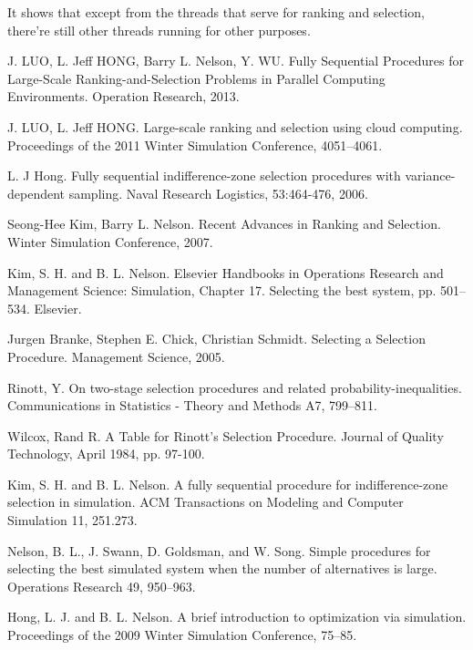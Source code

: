 \documentclass[12pt,a4paper]{report}
\begin{document}
It shows that except from the threads that serve for ranking and selection, there're still other threads running for other purposes.

\newpage
%

%

\begin{thebibliography}{99}

 J. LUO, L. Jeff HONG, Barry L. Nelson, Y. WU. Fully Sequential Procedures for Large-Scale Ranking-and-Selection Problems in Parallel Computing Environments. Operation Research, 2013.

 J. LUO, L. Jeff HONG. Large-scale ranking and selection using cloud computing. Proceedings of the 2011 Winter Simulation Conference, 4051–4061.

 L. J Hong. Fully sequential indifference-zone selection procedures with variance-dependent sampling. Naval Research Logistics, 53:464-476, 2006.

 Seong-Hee Kim, Barry L. Nelson. Recent Advances in Ranking and Selection. Winter Simulation Conference, 2007.

 Kim, S. H. and B. L. Nelson. Elsevier Handbooks in Operations Research and Management Science: Simulation, Chapter 17. Selecting the best system, pp. 501–534. Elsevier.

 Jurgen Branke, Stephen E. Chick, Christian Schmidt. Selecting a Selection Procedure. Management Science, 2005.

 Rinott, Y. On two-stage selection procedures and related probability-inequalities. Communications in Statistics - Theory and Methods A7, 799–811.

 Wilcox, Rand R. A Table for Rinott's Selection Procedure. Journal of Quality Technology, April 1984, pp. 97-100.

 Kim, S. H. and B. L. Nelson. A fully sequential procedure for indifference-zone selection in simulation. ACM Transactions on Modeling and Computer Simulation 11, 251.273.

 Nelson, B. L., J. Swann, D. Goldsman, and W. Song. Simple procedures for selecting the best simulated system when the number of alternatives is large. Operations Research 49, 950–963.

 Hong, L. J. and B. L. Nelson. A brief introduction to optimization via simulation. Proceedings of the 2009 Winter Simulation Conference, 75–85.


\end{thebibliography}
\end{document}
